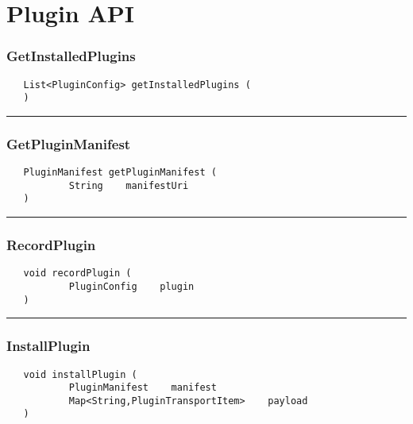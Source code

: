 \chapter{Plugin API}

\subsection{GetInstalledPlugins}
\label{Api:GetInstalledPlugins}
\begin{verbatim}
   List<PluginConfig> getInstalledPlugins (
   )
\end{verbatim}



\rule{15cm}{2pt}
\subsection{GetPluginManifest}
\label{Api:GetPluginManifest}
\begin{verbatim}
   PluginManifest getPluginManifest (
           String    manifestUri
   )
\end{verbatim}



\rule{15cm}{2pt}
\subsection{RecordPlugin}
\label{Api:RecordPlugin}
\begin{verbatim}
   void recordPlugin (
           PluginConfig    plugin
   )
\end{verbatim}



\rule{15cm}{2pt}
\subsection{InstallPlugin}
\label{Api:InstallPlugin}
\begin{verbatim}
   void installPlugin (
           PluginManifest    manifest
           Map<String,PluginTransportItem>    payload
   )
\end{verbatim}



